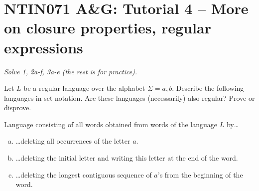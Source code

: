 \documentclass[a4paper,12pt]{amsart}
\begin{document}
\thispagestyle{empty}

\section*{NTIN071 A\&G: Tutorial 4 -- More on closure properties, regular expressions}


\medskip

\noindent\emph{Solve 1, 2a-f, 3a-e (the rest is for practice).}

\medskip


\medskip\begin{problem}[Delete]
    
    Let $L$ be a regular language over the alphabet $\Sigma={a,b}$. Describe the following languages in set notation. Are these languages (necessarily) also regular? Prove or disprove.
    
    \medskip

    Language consisting of all words obtained from words of the language $L$ by\dots

    \medskip

    \begin{enumerate}[(a)]\setlength\itemsep{12pt} 
        \item \dots deleting all occurrences of the letter $a$. 
        \item \dots deleting the initial letter and writing this letter at the end of the word. 
        \item \dots deleting the longest contiguous sequence of $a$'s from the beginning of the word. 
    \end{enumerate}

\end{problem}
\end{document}
